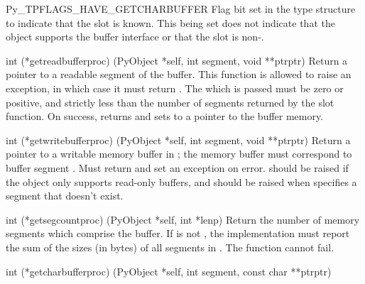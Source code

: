 \documentclass{manual}
\begin{document}
\begin{datadesc}{Py_TPFLAGS_HAVE_GETCHARBUFFER}
Flag bit set in the type structure to indicate that the
 slot is known.  This being set does not
indicate that the object supports the buffer interface or that the
 slot is non-\NULL.
\end{datadesc}

\begin{ctypedesc}[getreadbufferproc]{int (*getreadbufferproc)
                            (PyObject *self, int segment, void **ptrptr)}
Return a pointer to a readable segment of the buffer.  This function
is allowed to raise an exception, in which case it must return
.  The  which is passed must be zero or
positive, and strictly less than the number of segments returned by
the  slot function.  On success, returns
 and sets  to a pointer to the buffer
memory.
\end{ctypedesc}

\begin{ctypedesc}[getwritebufferproc]{int (*getwritebufferproc)
                            (PyObject *self, int segment, void **ptrptr)}
Return a pointer to a writable memory buffer in ;
the memory buffer must correspond to buffer segment .
Must return  and set an exception on error.
 should be raised if the object only supports
read-only buffers, and  should be raised when
 specifies a segment that doesn't exist.
\end{ctypedesc}

\begin{ctypedesc}[getsegcountproc]{int (*getsegcountproc)
                            (PyObject *self, int *lenp)}
Return the number of memory segments which comprise the buffer.  If
 is not \NULL, the implementation must report the sum of the 
sizes (in bytes) of all segments in .
The function cannot fail.
\end{ctypedesc}

\begin{ctypedesc}[getcharbufferproc]{int (*getcharbufferproc)
                            (PyObject *self, int segment, const char **ptrptr)}
\end{ctypedesc}


%


\end{document}
